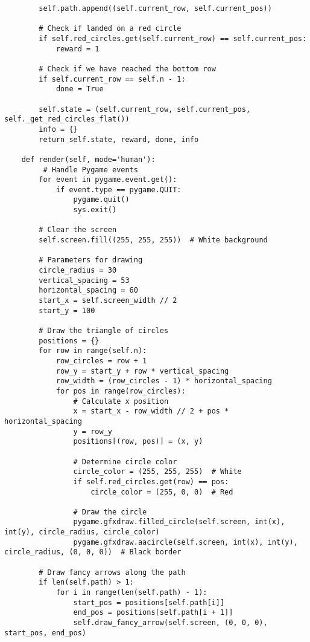 \begin{lstlisting}
        self.path.append((self.current_row, self.current_pos))

        # Check if landed on a red circle
        if self.red_circles.get(self.current_row) == self.current_pos:
            reward = 1

        # Check if we have reached the bottom row
        if self.current_row == self.n - 1:
            done = True

        self.state = (self.current_row, self.current_pos, self._get_red_circles_flat())
        info = {}
        return self.state, reward, done, info

    def render(self, mode='human'):
         # Handle Pygame events
        for event in pygame.event.get():
            if event.type == pygame.QUIT:
                pygame.quit()
                sys.exit()

        # Clear the screen
        self.screen.fill((255, 255, 255))  # White background

        # Parameters for drawing
        circle_radius = 30
        vertical_spacing = 53
        horizontal_spacing = 60
        start_x = self.screen_width // 2
        start_y = 100

        # Draw the triangle of circles
        positions = {}
        for row in range(self.n):
            row_circles = row + 1
            row_y = start_y + row * vertical_spacing
            row_width = (row_circles - 1) * horizontal_spacing
            for pos in range(row_circles):
                # Calculate x position
                x = start_x - row_width // 2 + pos * horizontal_spacing
                y = row_y
                positions[(row, pos)] = (x, y)

                # Determine circle color
                circle_color = (255, 255, 255)  # White
                if self.red_circles.get(row) == pos:
                    circle_color = (255, 0, 0)  # Red

                # Draw the circle
                pygame.gfxdraw.filled_circle(self.screen, int(x), int(y), circle_radius, circle_color)
                pygame.gfxdraw.aacircle(self.screen, int(x), int(y), circle_radius, (0, 0, 0))  # Black border

        # Draw fancy arrows along the path
        if len(self.path) > 1:
            for i in range(len(self.path) - 1):
                start_pos = positions[self.path[i]]
                end_pos = positions[self.path[i + 1]]
                self.draw_fancy_arrow(self.screen, (0, 0, 0), start_pos, end_pos)


\end{lstlisting}
